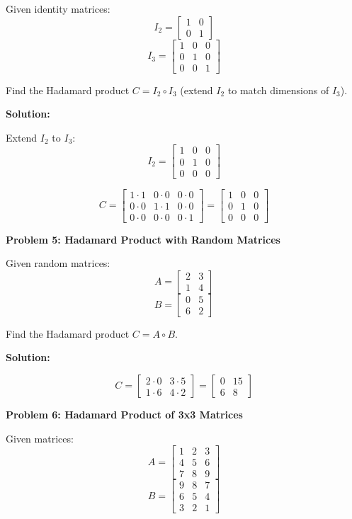 \documentclass[
  letterpaper,
  DIV=11,
  numbers=noendperiod]{scrreprt}
\theoremstyle{plain}
\theoremstyle{definition}
\theoremstyle{remark}
\begin{document}
Given identity matrices: \[I_2=\begin{bmatrix}1&0\\0&1\end{bmatrix}\]
\[I_3=\begin{bmatrix}1&0&0\\0&1&0\\0&0&1\end{bmatrix}\]

Find the Hadamard product \(C=I_2\circ I_3\) (extend \(I_2\) to match
dimensions of \(I_3\)).

\textbf{Solution:}

Extend \(I_2\) to \(I_3\):
\[I_2=\begin{bmatrix}1&0&0\\0&1&0\\0&0&0\end{bmatrix}\]

\[C=\begin{bmatrix}1\cdot 1&0\cdot 0&0\cdot 0\\0\cdot 0&1\cdot 1&0\cdot 0\\0\cdot 0&0\cdot 0&0\cdot 1\end{bmatrix}=\begin{bmatrix}1&0&0\\0&1&0\\0&0&0\end{bmatrix}\]

\textbf{Problem 5: Hadamard Product with Random Matrices}

Given random matrices: \[A=\begin{bmatrix}2&3\\1&4\end{bmatrix}\]
\[B=\begin{bmatrix}0&5\\6&2\end{bmatrix}\]

Find the Hadamard product \(C=A\circ B\).

\textbf{Solution:}

\[C=\begin{bmatrix}2\cdot 0&3\cdot 5\\1\cdot 6&4\cdot 2\end{bmatrix}=\begin{bmatrix}0&15\\6&8\end{bmatrix}\]

\textbf{Problem 6: Hadamard Product of 3x3 Matrices}

Given matrices: \[A=\begin{bmatrix}1&2&3\\4&5&6\\7&8&9\end{bmatrix}\]
\[B=\begin{bmatrix}9&8&7\\6&5&4\\3&2&1\end{bmatrix}\]
\end{document}
